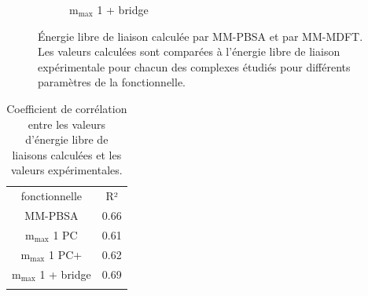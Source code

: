 \begin{figure}[H]
\begin{subfigure}[b]{0.50\textwidth}
        \centering
        \caption{$\mathrm{m}_\mathrm{max}$ 1 + bridge}
     \end{subfigure}
    \caption[Énergie libre de liaison calculée par MM-PBSA et par MM-MDFT.]{Énergie libre de liaison calculée par MM-PBSA et par MM-MDFT. Les valeurs calculées sont comparées à l'énergie libre de liaison expérimentale pour chacun des complexes étudiés pour différents paramètres de la fonctionnelle.}
    \label{fig:MMPBSA_MMMDFT_complete}
\end{figure}





\begin{table}[H]
  \begin{center}
    \begin{tabular}{c c}
      \hline & \\[-1em]\hline
       fonctionnelle  & R²  \\
      \hline
       MM-PBSA  & 0.66 \\
       $\mathrm{m}_\mathrm{max}$ 1 PC  & 0.61  \\
       $\mathrm{m}_\mathrm{max}$ 1 PC+  & 0.62  \\
       $\mathrm{m}_\mathrm{max}$ 1 + bridge  & 0.69  \\
      \hline & \\[-1em]\hline%
    \end{tabular}
  \end{center}
  \caption{Coefficient de corrélation entre les valeurs d'énergie libre de liaisons calculées et les valeurs expérimentales.}
  \label{tab:MMPBSA_correlation}  
\end{table}




